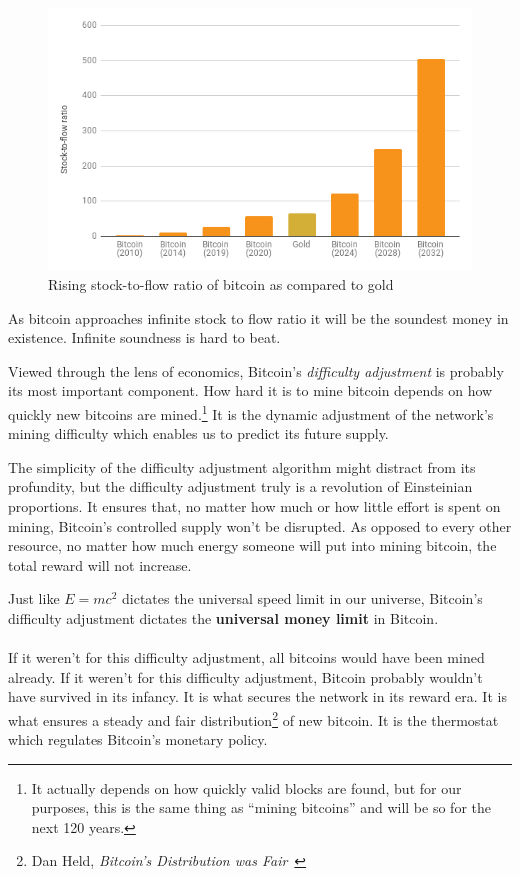 \begin{figure}
  \includegraphics{assets/images/soundness-over-time.png}
  \caption{Rising stock-to-flow ratio of bitcoin as compared to gold}
  \label{fig:soundness-over-time}
\end{figure}

As bitcoin approaches infinite stock to flow ratio it will be the
soundest money in existence. Infinite soundness is hard to beat.

Viewed through the lens of economics, Bitcoin's \textit{difficulty adjustment}
is probably its most important component. How hard it is to mine bitcoin depends
on how quickly new bitcoins are mined.\footnote{It actually depends on how
quickly valid blocks are found, but for our purposes, this is the same thing as
\enquote{mining bitcoins} and will be so for the next 120 years.} It is the dynamic
adjustment of the network's mining difficulty which enables us to predict its
future supply.

The simplicity of the difficulty adjustment algorithm might distract
from its profundity, but the difficulty adjustment truly is a revolution
of Einsteinian proportions. It ensures that, no matter how much or how
little effort is spent on mining, Bitcoin's controlled supply won't be
disrupted. As opposed to every other resource, no matter how much
energy someone will put into mining bitcoin, the total reward will not
increase.

Just like $E=mc^2$ dictates the universal speed limit in our universe,
Bitcoin's difficulty adjustment dictates the \textbf{universal money limit}
in Bitcoin.

\paragraph{}
If it weren't for this difficulty adjustment, all bitcoins would have been mined
already. If it weren't for this difficulty adjustment, Bitcoin probably wouldn't
have survived in its infancy. It is what secures the network in its reward era.
It is what ensures a steady and fair distribution\footnote{Dan Held,
\textit{Bitcoin's Distribution was Fair}~\cite{distribution-was-fair}} of new
bitcoin. It is the thermostat which regulates Bitcoin's monetary policy.

